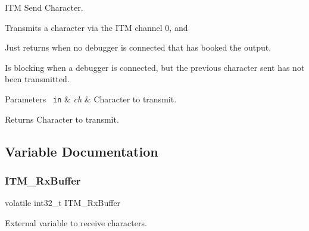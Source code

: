 I\+TM Send Character. 

Transmits a character via the I\+TM channel 0, and \begin{DoxyItemize}
\item Just returns when no debugger is connected that has booked the output. \item Is blocking when a debugger is connected, but the previous character sent has not been transmitted. 
\begin{DoxyParams}[1]{Parameters}
\mbox{\texttt{ in}}  & {\em ch} & Character to transmit. \\
\hline
\end{DoxyParams}
\begin{DoxyReturn}{Returns}
Character to transmit. 
\end{DoxyReturn}
\end{DoxyItemize}


\subsection{Variable Documentation}
\mbox{\label{group__CMSIS__core__DebugFunctions_ga12e68e55a7badc271b948d6c7230b2a8}} 
\subsubsection{\texorpdfstring{ITM\_RxBuffer}{ITM\_RxBuffer}}
{\footnotesize\ttfamily volatile int32\+\_\+t I\+T\+M\+\_\+\+Rx\+Buffer}

External variable to receive characters. 
